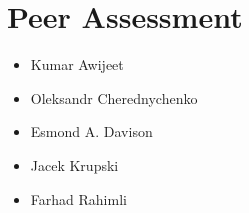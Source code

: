 \section{Peer Assessment}

 \begin{itemize}
        \item Kumar Awijeet
		\item Oleksandr Cherednychenko
		\item Esmond A. Davison
		\item Jacek Krupski
		\item Farhad Rahimli
    \end{itemize}

\setlength{\parskip}{0em}
